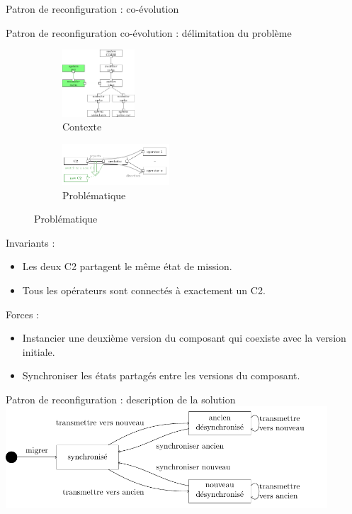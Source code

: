 \begin{frame}{Patron de reconfiguration : co-évolution}
\end{frame}

\begin{frame}{Patron de reconfiguration co-évolution : délimitation du problème}
\begin{figure}
\begin{subfigure}[b]{0.4\textwidth}
\includegraphics[height=2.5cm]{imgs/fig_rearchitecture}
\caption{Contexte}
\end{subfigure}
\begin{subfigure}[b]{0.4\textwidth}
\includegraphics[width=4cm]{imgs/dc_archi-C2}
\caption{Problématique}
\end{subfigure}
\end{figure}

Invariants :
\begin{itemize}
\item Les deux C2 partagent le même état de mission.
\item Tous les opérateurs sont connectés à exactement un
C2. 
\end{itemize}

Forces :
\begin{itemize}
\item Instancier une deuxième version du composant qui coexiste avec
la version initiale.
\item Synchroniser les états partagés entre les versions du
composant.
\end{itemize}

\end{frame}

\begin{frame}{Patron de reconfiguration : description de la solution}
\includegraphics[width=12cm]{imgs/slide_solution_coevolution.pdf}
\end{frame}


